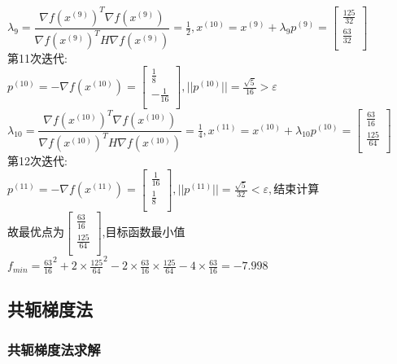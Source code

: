 \begin{solution}
    $\lambda_9=\dfrac{\nabla f(x^{(9)})^T\nabla f(x^{(9)})}{\nabla f(x^{(9)})^TH\nabla f(x^{(9)})}=\frac{1}{2},x^{(10)}=x^{(9)}+\lambda_9p^{(9)}=\begin{bmatrix} \frac{125}{32}\\\frac{63}{32}\\\end{bmatrix}$\\
    第11次迭代:\\
    $p^{(10)}=-\nabla f(x^{(10)})=\begin{bmatrix} \frac{1}{8}\\-\frac{1}{16}\\\end{bmatrix},||p^{(10)}||=\frac{\sqrt{5}}{16}>\varepsilon$\\
    $\lambda_{10}=\dfrac{\nabla f(x^{(10)})^T\nabla f(x^{(10)})}{\nabla f(x^{(10)})^TH\nabla f(x^{(10)})}=\frac{1}{4},x^{(11)}=x^{(10)}+\lambda_{10}p^{(10)}=\begin{bmatrix} \frac{63}{16}\\\frac{125}{64}\\\end{bmatrix}$\\
    第12次迭代:\\
    $p^{(11)}=-\nabla f(x^{(11)})=\begin{bmatrix} \frac{1}{16}\\\frac{1}{8}\\\end{bmatrix},||p^{(11)}||=\frac{\sqrt{5}}{32}<\varepsilon,\text{结束计算}$\\
    故最优点为$\begin{bmatrix} \frac{63}{16}\\\frac{125}{64}\\\end{bmatrix}$,目标函数最小值$f_{min}=\frac{63}{16}^2+2\times\frac{125}{64}^2-2\times\frac{63}{16}\times\frac{125}{64}-4\times\frac{63}{16}=-7.998$
\end{solution}

\subsection{共轭梯度法}

\subsubsection{共轭梯度法求解}

